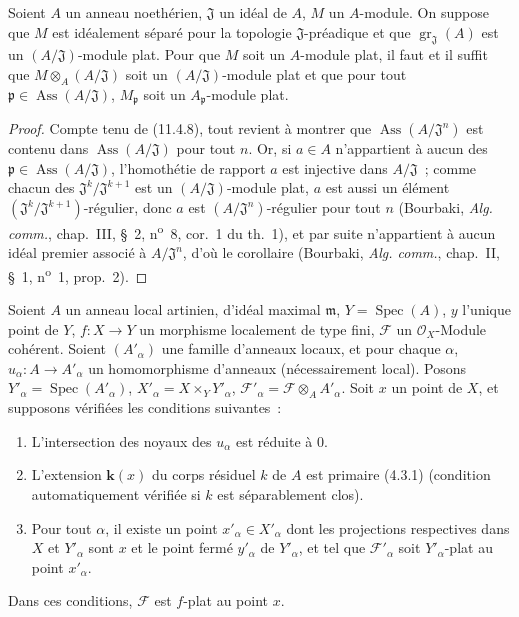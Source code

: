 \begin{corollary}[11.4.10]
\label{IV.11.4.10-fr}
Soient $A$ un anneau noethérien, $\mathfrak J$ un idéal de $A$, $M$ un
$A$-module. On suppose que $M$ est idéalement séparé pour la topologie
$\mathfrak J$-préadique et que $\operatorname{gr}_{\mathfrak J}(A)$ est un
$(A/\mathfrak J)$-module plat. Pour que $M$ soit un $A$-module plat, il faut et
il suffit que $M\otimes_A(A/\mathfrak J)$ soit un $(A/\mathfrak J)$-module plat
et que pour tout $\mathfrak p\in\operatorname{Ass}(A/\mathfrak J)$,
$M_{\mathfrak p}$ soit un $A_{\mathfrak p}$-module plat.
\end{corollary}

\begin{proof}
Compte tenu de (11.4.8), tout revient à montrer que
$\operatorname{Ass}(A/\mathfrak J^n)$ est contenu dans
$\operatorname{Ass}(A/\mathfrak J)$ pour tout $n$. Or, si $a\in A$ n'appartient
à aucun des $\mathfrak p\in\operatorname{Ass}(A/\mathfrak J)$, l'homothétie de
rapport $a$ est injective dans $A/\mathfrak J$~; comme chacun des
$\mathfrak J^k/\mathfrak J^{k+1}$ est un $(A/\mathfrak J)$-module plat, $a$ est
aussi un élément $(\mathfrak J^k/\mathfrak J^{k+1})$-régulier, donc $a$ est
$(A/\mathfrak J^n)$-régulier pour tout $n$ (Bourbaki, \emph{Alg. comm.},
chap.~III, \S~2, n\textsuperscript{o}~8, cor.~1 du th.~1), et par suite n'appartient à
aucun idéal premier associé à $A/\mathfrak J^n$, d'où le corollaire (Bourbaki,
\emph{Alg. comm.}, chap.~II, \S~1, n\textsuperscript{o}~1, prop.~2).
\end{proof}

\begin{proposition}[11.4.11]
\label{IV.11.4.11-fr}
Soient $A$ un anneau local artinien, d'idéal maximal $\mathfrak m$,
$Y=\operatorname{Spec}(A)$, $y$ l'unique point de $Y$, $f:X\to Y$ un morphisme
localement de type fini, $\mathcal F$ un $\mathcal O_X$-Module cohérent. Soient
$(A'_\alpha)$ une famille d'anneaux locaux, et pour chaque $\alpha$,
$u_\alpha:A\to A'_\alpha$ un homomorphisme d'anneaux (nécessairement local).
Posons $Y'_\alpha=\operatorname{Spec}(A'_\alpha)$,
$X'_\alpha=X\times_Y Y'_\alpha$,
$\mathcal F'_\alpha=\mathcal F\otimes_A A'_\alpha$. Soit $x$ un point de $X$,
et supposons vérifiées les conditions suivantes~:
\begin{enumerate}[label=\textup{(\roman*)}]
  \item L'intersection des noyaux des $u_\alpha$ est réduite à $0$.
  \item L'extension $\boldsymbol{k}(x)$ du corps résiduel $k$ de $A$ est primaire \textup{(4.3.1)}
  (condition automatiquement vérifiée si $k$ est séparablement clos).
  \item Pour tout $\alpha$, il existe un point $x'_\alpha\in X'_\alpha$ dont
  les projections respectives dans $X$ et $Y'_\alpha$ sont $x$ et le point
  fermé $y'_\alpha$ de $Y'_\alpha$, et tel que $\mathcal F'_\alpha$ soit
  $Y'_\alpha$-plat au point $x'_\alpha$.
\end{enumerate}

Dans ces conditions, $\mathcal F$ est $f$-plat au point $x$.
\end{proposition}

